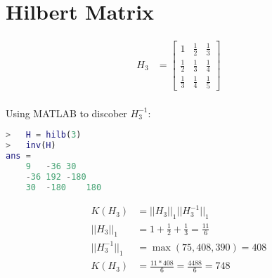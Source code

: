 \section{Hilbert Matrix}

	\begin{align}
		H_{3} &= 
		\begin{bmatrix}
			1 & \frac{1}{2} & \frac{1}{3} \\
			\frac{1}{2} & \frac{1}{3} & \frac{1}{4} \\
			\frac{1}{3} & \frac{1}{4} & \frac{1}{5}
		\end{bmatrix}& \\
	\label{eq:75}
	\end{align}

	Using MATLAB to discober $H_{3}^{-1}$:

	\begin{lstlisting}[language=MATLAB]
>	H = hilb(3)
>	inv(H)
ans =
	9	-36	30
	-36	192	-180
	30	-180	180
	\end{lstlisting}

	\begin{align}
		K(H_{3}) &= ||H_{3}||_{1}||H_{3}^{-1}||_{1}& \\
		||H_{3}||_{1} &= 1 + \frac{1}{2} + \frac{1}{3} = \frac{11}{6}& \\
		||H_{3}^{-1}||_{1} &= \max \left( 75, 408, 390 \right) = 408& \\
		K(H_{3}) &= \frac{11*408}{6} = \frac{4488}{6} = 748
	\end{align}
